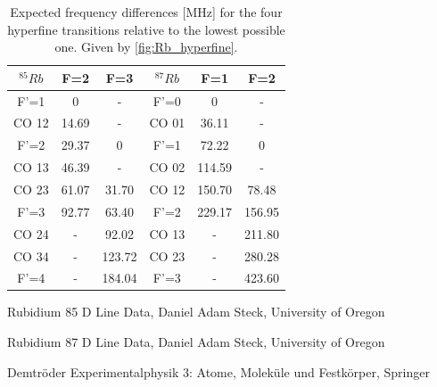 \documentclass[]{article}
\begin{document}
\begin{table}[H]
\centering
\begin{tabular}{c|c|c| |c|c|c}
$^{85}Rb$ & F=2 & F=3 & $^{87}Rb$ & F=1 & F=2 \\ \hline\hline
F'=1 & 0    & -     & F'=0 & 0     & - \\
CO 12& 14.69& -     & CO 01& 36.11 & - \\
F'=2 & 29.37& 0     & F'=1 & 72.22 & 0 \\
CO 13& 46.39& -     & CO 02& 114.59& - \\
CO 23& 61.07& 31.70 & CO 12& 150.70& 78.48 \\
F'=3 & 92.77& 63.40 & F'=2 & 229.17& 156.95 \\
CO 24& -    & 92.02 & CO 13& -     & 211.80 \\
CO 34& -    & 123.72& CO 23& -     & 280.28 \\
F'=4 & -    & 184.04& F'=3 & -     & 423.60 \\
\end{tabular}
\caption{Expected frequency differences [MHz] for the four hyperfine transitions relative to the lowest possible one. Given by \autoref{fig:Rb_hyperfine}.}
\label{tab: rel rb freq}
\end{table}


\newpage
\begin{thebibliography}{}
 Rubidium 85 D Line Data, Daniel Adam Steck, University of Oregon

 Rubidium 87 D Line Data, Daniel Adam Steck, University of Oregon

 Demtröder Experimentalphysik 3: Atome, Moleküle und Festkörper, Springer


\end{thebibliography}
\end{document}
